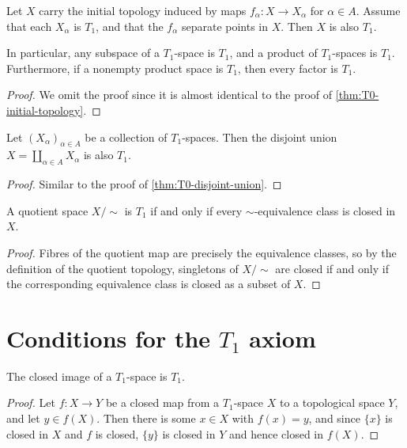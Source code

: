 \documentclass[article, a4paper, 11pt, oneside]{memoir}
\numberwithin{equation}{chapter}
\begin{document}
\begin{proposition}
    \label{thm:T1-initial-topology}
    Let $X$ carry the initial topology induced by maps $f_\alpha \colon X \to X_\alpha$ for $\alpha \in A$. Assume that each $X_\alpha$ is $T_1$, and that the $f_\alpha$ separate points in $X$. Then $X$ is also $T_1$.

    In particular, any subspace of a $T_1$-space is $T_1$, and a product of $T_1$-spaces is $T_1$. Furthermore, if a nonempty product space is $T_1$, then every factor is $T_1$.
\end{proposition}

\begin{proof}
    We omit the proof since it is almost identical to the proof of \cref{thm:T0-initial-topology}.
\end{proof}


\begin{proposition}
    Let $(X_\alpha)_{\alpha \in A}$ be a collection of $T_1$-spaces. Then the disjoint union $X = \coprod_{\alpha \in A} X_\alpha$ is also $T_1$.
\end{proposition}

\begin{proof}
    Similar to the proof of \cref{thm:T0-disjoint-union}.
\end{proof}


\begin{proposition}
    A quotient space $X/{\sim}$ is $T_1$ if and only if every $\sim$-equivalence class is closed in $X$.
\end{proposition}

\begin{proof}
    Fibres of the quotient map are precisely the equivalence classes, so by the definition of the quotient topology, singletons of $X/{\sim}$ are closed if and only if the corresponding equivalence class is closed as a subset of $X$.
\end{proof}


\section[Conditions for the T1 axiom]{Conditions for the $T_1$ axiom}

\begin{proposition}
    The closed image\footnotemark{} of a $T_1$-space is $T_1$.
\end{proposition}

\begin{proof}%
    Let $f \colon X \to Y$ be a closed map from a $T_1$-space $X$ to a topological space $Y$, and let $y \in f(X)$. Then there is some $x \in X$ with $f(x) = y$, and since $\{x\}$ is closed in $X$ and $f$ is closed, $\{y\}$ is closed in $Y$ and hence closed in $f(X)$.
\end{proof}
\end{document}

